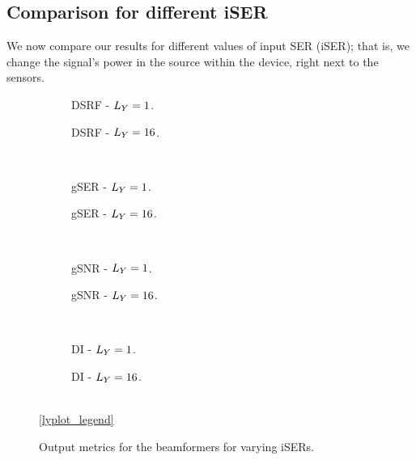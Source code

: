 
\subsection{Comparison for different iSER}

We now compare our results for different values of input SER (iSER); that is, we change the signal's power in the source within the device, right next to the sensors.
\begin{figure}[!ht]
	\centering
	\begin{subfigure}{0.49\textwidth}
		\centering
		
		\caption{DSRF - $\Ly = 1$.}
		\label{subfig:lineplot__DSRF__iSER_var__Ly_1}
	\end{subfigure}\hfill
	\begin{subfigure}{0.49\textwidth}
		\centering
		
		\caption{DSRF - $\Ly = 16$.}
		\label{subfig:lineplot__DSRF__iSER_var__Ly_16}
	\end{subfigure}\\[1em]
	\begin{subfigure}{0.49\textwidth}
		\centering
		
		\caption{gSER - $\Ly = 1$.}
		\label{subfig:lineplot__gSER__iSER_var__Ly_1}
	\end{subfigure}\hfill
	\begin{subfigure}{0.49\textwidth}
		\centering
		
		\caption{gSER - $\Ly = 16$.}
		\label{subfig:lineplot__gSER__iSER_var__Ly_16}
	\end{subfigure}\\[1em]
	\begin{subfigure}{0.49\textwidth}
		\centering
		
		\caption{gSNR - $\Ly = 1$.}
		\label{subfig:lineplot__gSNR__iSER_var__Ly_1}
	\end{subfigure}\hfill
	\begin{subfigure}{0.49\textwidth}
		\centering
		
		\caption{gSNR - $\Ly = 16$.}
		\label{subfig:lineplot__gSNR__iSER_var__Ly_16}
	\end{subfigure}\\[1em]
	\begin{subfigure}{0.49\textwidth}
		\centering
		
		\caption{DI - $\Ly = 1$.}
		\label{subfig:lineplot__DI__iSER_var__Ly_1}
	\end{subfigure}\hfill
	\begin{subfigure}{0.49\textwidth}
		\centering
		
		\caption{DI - $\Ly = 16$.}
		\label{subfig:lineplot__DI__iSER_var__Ly_16}
	\end{subfigure}\\[1em]
	\ref*{lyplot_legend}
	\caption{Output metrics for the beamformers for varying iSERs.}
	\label{fig:lineplot__iSER_var__Ly_1}
\end{figure}
